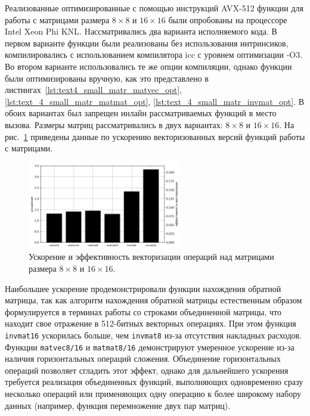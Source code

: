 Реализованные оптимизированные с помощью инструкций AVX-512 функции для работы с матрицами размера $8 \times 8$ и $16 \times 16$ были опробованы на процессоре Intel Xeon Phi KNL.
Hассматривались два варианта исполняемого кода.
В первом варианте функции были реализованы без использования интринсиков, компилировались с использованием компилятора icc с уровнем оптимизации -O3.
Во втором варианте использовались те же опции компиляции, однако функции были оптимизированы вручную, как это представлено в листингах~\ref{lst:text4_small_matr_matvec_opt}, \ref{lst:text_4_small_matr_matmat_opt}, \ref{lst:text_4_small_matr_invmat_opt}.
В обоих вариантах был запрещен инлайн рассматриваемых функций в место вызова.
Размеры матриц рассматривались в двух вариантах: $8 \times 8$ и $16 \times 16$.
На рис.~\ref{fig:text_4_small_matr_res} приведены данные по ускорению векторизованных версий функций работы с матрицами.

\begin{figure}[ht]
\centering
\includegraphics[width=0.6\textwidth]{./fig/vec_small_matr_res.png}
\singlespacing
{}\caption{Ускорение и эффективность векторизации операций над матрицами размера $8 \times 8$ и $16 \times 16$.}
\label{fig:text_4_small_matr_res}
\end{figure}

Наибольшее ускорение продемонстрировали функции нахождения обратной матрицы, так как алгоритм нахождения обратной матрицы естественным образом формулируется в терминах работы со строками объединенной матрицы, что находит свое отражение в 512-битных векторных операциях.
При этом функция \texttt{invmat16} ускорилась больше, чем \texttt{invmat8} из-за отсутствия накладных расходов.
Функции \texttt{matvec8/16} и \texttt{matmat8/16} демонстрируют умеренное ускорение из-за наличия горизонтальных операций сложения.
Объединение горизонтальных операций позволяет сгладить этот эффект, однако для дальнейшего ускорения требуется реализация объединенных функций, выполняющих одновременно сразу несколько операций или применяющих одну операцию к более широкому набору данных (например, функция перемножение двух пар матриц).

